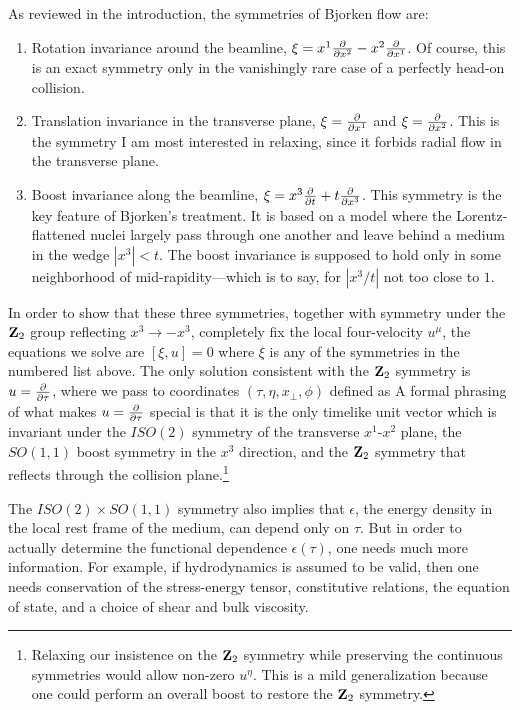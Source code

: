 \documentclass[12pt]{article}
\def\arctanh{\mop{arctanh}}
\begin{document}
As reviewed in the introduction, the symmetries of Bjorken flow are:
 \begin{enumerate}
  \item Rotation invariance around the beamline, $\xi = x^1 {\partial \over \partial x^2} - x^2 {\partial \over \partial x^1}$.  Of course, this is an exact symmetry only in the vanishingly rare case of a perfectly head-on collision. 
  \item Translation invariance in the transverse plane, $\xi = {\partial \over \partial x^1}$ and $\xi = {\partial \over \partial x^2}$.  This is the symmetry I am most interested in relaxing, since it forbids radial flow in the transverse plane.
  \item Boost invariance along the beamline, $\xi = x^3 {\partial \over \partial t} + t {\partial \over \partial x^3}$.  This symmetry is the key feature of Bjorken's treatment.  It is based on a model where the Lorentz-flattened nuclei largely pass through one another and leave behind a medium in the wedge $|x^3| < t$.  The boost invariance is supposed to hold only in some neighborhood of mid-rapidity---which is to say, for $|x^3/t|$ not too close to $1$. 
 \end{enumerate}
In order to show that these three symmetries, together with symmetry under the ${\bf Z}_2$ group reflecting $x^3 \to -x^3$, completely fix the local four-velocity $u^\mu$, the equations we solve are $[\xi,u] = 0$ where $\xi$ is any of the symmetries in the numbered list above.  The only solution consistent with the ${\bf Z}_2$ symmetry is $u = {\partial \over \partial\tau}$, where we pass to coordinates $(\tau,\eta,x_\perp,\phi)$ defined as
 \eqn[c]{SemiPolar}{
  \tau = \sqrt{t^2 - (x^3)^2} \qquad \eta = \arctanh {x^3 \over t}  \cr
  x_\perp = \sqrt{(x^1)^2 + (x^2)^2} \qquad \phi = \arctan {x^2 \over x^1} \,.
 }
A formal phrasing of what makes $u = {\partial \over \partial\tau}$ special is that it is the only timelike unit vector which is invariant under the $ISO(2)$ symmetry of the transverse $x^1$-$x^2$ plane, the $SO(1,1)$ boost symmetry in the $x^3$ direction, and the ${\bf Z}_2$ symmetry that reflects through the collision plane.\footnote{Relaxing our insistence on the ${\bf Z}_2$ symmetry while preserving the continuous symmetries would allow non-zero $u^\eta$.  This is a mild generalization because one could perform an overall boost to restore the ${\bf Z}_2$ symmetry.}

The $ISO(2) \times SO(1,1)$ symmetry also implies that $\epsilon$, the energy density in the local rest frame of the medium, can depend only on $\tau$.  But in order to actually determine the functional dependence $\epsilon(\tau)$, one needs much more information.  For example, if hydrodynamics is assumed to be valid, then one needs conservation of the stress-energy tensor, constitutive relations, the equation of state, and a choice of shear and bulk viscosity.  
\end{document}
